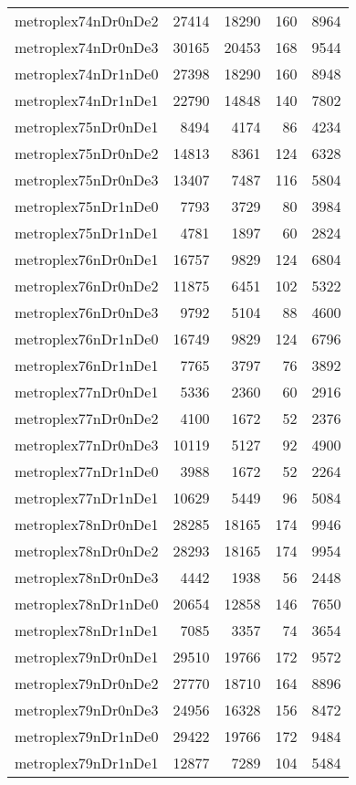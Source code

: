 \begin{longtable}{lrrrr}
metroplex74nDr0nDe2 & 27414 & 18290 & 160 & 8964 \\
metroplex74nDr0nDe3 & 30165 & 20453 & 168 & 9544 \\
metroplex74nDr1nDe0 & 27398 & 18290 & 160 & 8948 \\
metroplex74nDr1nDe1 & 22790 & 14848 & 140 & 7802 \\
metroplex75nDr0nDe1 & 8494 & 4174 & 86 & 4234 \\
metroplex75nDr0nDe2 & 14813 & 8361 & 124 & 6328 \\
metroplex75nDr0nDe3 & 13407 & 7487 & 116 & 5804 \\
metroplex75nDr1nDe0 & 7793 & 3729 & 80 & 3984 \\
metroplex75nDr1nDe1 & 4781 & 1897 & 60 & 2824 \\
metroplex76nDr0nDe1 & 16757 & 9829 & 124 & 6804 \\
metroplex76nDr0nDe2 & 11875 & 6451 & 102 & 5322 \\
metroplex76nDr0nDe3 & 9792 & 5104 & 88 & 4600 \\
metroplex76nDr1nDe0 & 16749 & 9829 & 124 & 6796 \\
metroplex76nDr1nDe1 & 7765 & 3797 & 76 & 3892 \\
metroplex77nDr0nDe1 & 5336 & 2360 & 60 & 2916 \\
metroplex77nDr0nDe2 & 4100 & 1672 & 52 & 2376 \\
metroplex77nDr0nDe3 & 10119 & 5127 & 92 & 4900 \\
metroplex77nDr1nDe0 & 3988 & 1672 & 52 & 2264 \\
metroplex77nDr1nDe1 & 10629 & 5449 & 96 & 5084 \\
metroplex78nDr0nDe1 & 28285 & 18165 & 174 & 9946 \\
metroplex78nDr0nDe2 & 28293 & 18165 & 174 & 9954 \\
metroplex78nDr0nDe3 & 4442 & 1938 & 56 & 2448 \\
metroplex78nDr1nDe0 & 20654 & 12858 & 146 & 7650 \\
metroplex78nDr1nDe1 & 7085 & 3357 & 74 & 3654 \\
metroplex79nDr0nDe1 & 29510 & 19766 & 172 & 9572 \\
metroplex79nDr0nDe2 & 27770 & 18710 & 164 & 8896 \\
metroplex79nDr0nDe3 & 24956 & 16328 & 156 & 8472 \\
metroplex79nDr1nDe0 & 29422 & 19766 & 172 & 9484 \\
metroplex79nDr1nDe1 & 12877 & 7289 & 104 & 5484 \\

\end{longtable}
